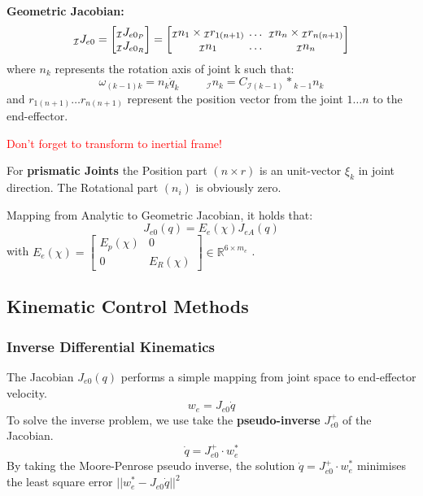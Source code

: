 \documentclass[fontsize=6pt,DIV=calc,a4paper,ngerman]{scrartcl}
\begin{document}
\begin{multicols*}{4}
	\smallskip
	\textbf{Geometric Jacobian:}
	$$ {}_\mathcal{I}J_{e0} =
		\begin{bmatrix}{}
			{}_\mathcal{I}J_{e0_P} \\ {}_\mathcal{I}J_{e0_R}
		\end{bmatrix}
		=
		\setlength\arraycolsep{2pt}
		\begin{bmatrix}{}
			{}_\mathcal{I}n_1 \times {}_\mathcal{I}r_{1(n+1)} & \dots & {}_\mathcal{I}n_n \times {}_\mathcal{I}r_{n(n+1)} \\
			{}_\mathcal{I}n_1                                 & \dots & {}_\mathcal{I}n_n
		\end{bmatrix}$$
	where $n_k$ represents the rotation axis of joint k such that: 
	$$\omega_{(k-1)k} = n_k \dot{q}_k \hspace{1cm} {}_\mathcal{I}n_k = C_{\mathcal{I}(k-1)} * {}_{k-1}n_k$$
	and $r_{1(n+1)} \dots r_{n(n+1)}$ represent the position vector from the joint $1 \dots n$ to the end-effector.

	\textcolor{red}{Don't forget to transform to inertial frame!}

	\smallskip
	For \textbf{prismatic Joints}  the Position part $(n\times r)$ is an unit-vector $\xi_k$ in joint direction. The Rotational part $(n_i)$ is obviously zero.

	\smallskip
	Mapping from Analytic to Geometric Jacobian, it holds that:
	$$J_{e0}(q) = E_e(\chi)J_{eA}(q)$$
	with $E_e(\chi) = \left[\begin{smallmatrix}
				E_p(\chi) & 0 \\
				0 & E_R(\chi)
			\end{smallmatrix}\right] \in \mathbb{R}^{6 \times m_e}$ .

	\subsection{Kinematic Control Methods}
	\subsubsection{Inverse Differential Kinematics}
	The Jacobian $J_{e0}(q)$  performs a simple mapping from joint space to end-effector velocity.
	$$w_e=J_{e0}\dot{q}$$
	To solve the inverse problem, we use take the \textbf{pseudo-inverse} $J_{e0}^+$ of the Jacobian.
	$$\dot{q} = J_{e0}^+ \cdot w_e^*$$
	By taking the Moore-Penrose pseudo inverse, the solution $\dot{q} = J_{e0}^+ \cdot w_e^*$ minimises the least square error $||w_e^*-J_{e0}\dot{q}||^2$


\end{multicols*}
\end{document}
